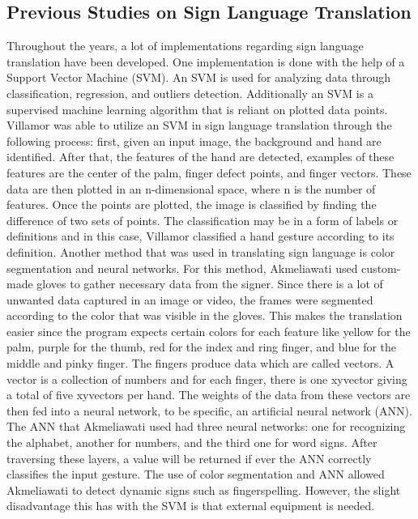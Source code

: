 \documentclass[journal]{./IEEE/IEEEtran}
\begin{document}
\subsection{Previous Studies on Sign Language Translation}
Throughout the years, a lot of implementations regarding sign language translation have been developed.
\newline
\indent One implementation is done with the help of a Support Vector Machine (SVM). An SVM is used for analyzing data through classification, regression, and outliers detection. Additionally an SVM is a supervised machine learning algorithm that is reliant on plotted data points. Villamor \cite{Villamor2018} was able to utilize an SVM in sign language translation through the following process: first, given an input image, the background and hand are identified. After that, the features of the hand are detected, examples of these features are the center of the palm, finger defect points, and finger vectors. These data are then plotted in an n-dimensional space, where n is the number of features. Once the points are plotted, the image is classified by finding the difference of two sets of points. The classification may be in a form of labels or definitions and in this case, Villamor classified a hand gesture according to its definition.
\newline
\indent Another method that was used in translating sign language is color segmentation and neural networks. For this method, Akmeliawati \cite{Akmeliawati2007} used custom-made gloves to gather necessary data from the signer. Since there is a lot of unwanted data captured in an image or video, the frames were segmented according to the color that was visible in the gloves. This makes the translation easier since the program expects certain colors for each feature like yellow for the palm, purple for the thumb, red for the index and ring finger, and blue for the middle and pinky finger.
\newline
\indent The fingers produce data which are called vectors. A vector is a collection of numbers and for each finger, there is one xyvector giving a total of five xyvectors per hand. The weights of the data from these vectors are then fed into a neural network, to be specific, an artificial neural network (ANN). The ANN that Akmeliawati used had three neural networks: one for recognizing the alphabet, another for numbers, and the third one for word signs. After traversing these layers, a value will be returned if ever the ANN correctly classifies the input gesture. The use of color segmentation and ANN allowed Akmeliawati to detect dynamic signs such as fingerspelling. However, the slight disadvantage this has with the SVM is that external equipment is needed.
\end{document}
